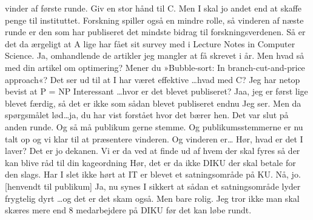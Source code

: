\documentclass[a4paper,11pt]{article}
\begin{document}
\begin{sketch}
  vinder af første runde. Giv en stor hånd til C.
 Men I skal jo andet end at skaffe penge til instituttet.
  Forskning spiller også en mindre rolle, så vinderen af næste runde er
  den som har publiseret det mindste bidrag til forskningsverdenen.
 Så er det da ærgeligt at A lige har fået sit survey med i Lecture Notes in Computer Science.
 Ja, omhandlende de artikler jeg mangler at få skrevet i år. Men hvad
  så med din artikel om optimering?
 Mener du »Bubble-sort: In branch-cut-and-price approach«?
 Det ser ud til at I har været effektive \ldots hvad med C?
 Jeg har netop bevist at P = NP
 Interessant \ldots hvor er det blevet publiseret?
 Jaa, jeg er først lige blevet færdig, så det er ikke som sådan blevet
  publiseret endnu
 Jeg ser. Men da spørgsmålet lød\ldots ja, du har vist forstået hvor det
  bærer hen.
 Det var slut på anden runde.  Og så må publikum gerne stemme.
 Og publikumsstemmerne er nu talt op og vi
  klar til at præsentere vinderen. 
 Og vinderen er\ldots
{}
 Hør, hvad er det I laver?
 Det er jo dekanen. Vi er da ved at finde ud af hvem
  der skal fyres så der kan blive råd til din kageordning
 Hør, det er da ikke DIKU der skal betale for den slags. Har I slet
  ikke hørt at IT er blevet et satningsområde på KU.
 Nå, jo.
[henvendt til publikum] Ja, nu synes I sikkert at sådan et
  satningsområde lyder frygtelig dyrt \ldots og det er det skam også. Men
  bare rolig. Jeg tror ikke man skal skæres mere end 8 medarbejdere på
  DIKU før det kan løbe rundt.


\end{sketch}
\end{document}

